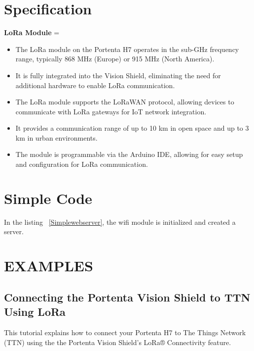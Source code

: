 \section{Specification}
\textbf{LoRa Module} =  

\begin{itemize}
	
	\item The LoRa module on the Portenta H7 operates in the sub-GHz frequency range, typically 868 MHz (Europe) or 915 MHz (North America).
	\item It is fully integrated into the Vision Shield, eliminating the need for additional hardware to enable LoRa communication.
	\item The LoRa module supports the LoRaWAN protocol, allowing devices to communicate with LoRa gateways for IoT network integration.
	\item It provides a communication range of up to 10 km in open space and up to 3 km in urban environments.
	\item The module is programmable via the Arduino IDE, allowing for easy setup and configuration for LoRa communication. \cite{connecting_to_ttn_portenta_vision_shield:2024}
	
\end{itemize}


\section{Simple Code}
In the listing  ~\ref{Simplewebserver}, the wifi module is initialized and created a server.

{
	\label{Simplewebserver}
}



\section{EXAMPLES}

\subsection{Connecting the Portenta Vision Shield to TTN Using LoRa}
This tutorial explains how to connect your Portenta H7 to The Things Network (TTN) using the the Portenta Vision Shield's LoRa® Connectivity feature. \cite{connecting_to_ttn_portenta_vision_shield:2024}

